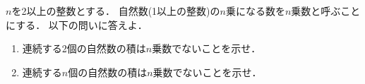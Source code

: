 \documentclass[../../main.tex]{subfiles}
\begin{document}
$n$を2以上の整数とする．
自然数(1以上の整数)の$n$乗になる数を$n$乗数と呼ぶことにする．
以下の問いに答えよ．
\begin{enumerate}
  \item 連続する2個の自然数の積は$n$乗数でないことを示せ．
  \item 連続する$n$個の自然数の積は$n$乗数でないことを示せ．
\end{enumerate}
\end{document}
